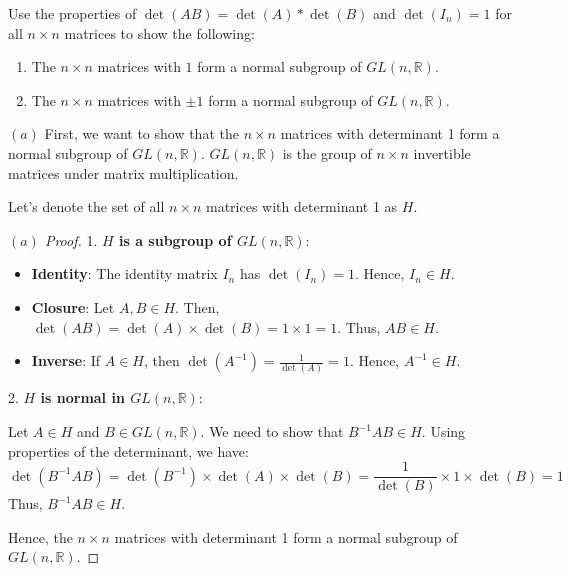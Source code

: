\documentclass[12pt]{amsart}
\theoremstyle{definition}
\numberwithin{equation}{section}
\theoremstyle{plain}
\newcommand{\R}{\mathbb{R}}
\begin{document}
\vspace*{20pt}
\begin{exercise}{40} Use the properties of $\det(AB) = \det(A)*\det(B)$ and $\det(I_n)=1$ for all $n\times n$ matrices to show the following:

    \begin{enumerate}[label=(\alph*.)]
        \item The $n \times n$ matrices with $1$ form a normal subgroup of $GL(n,\R)$.
        \item The $n \times n$ matrices with $\pm 1$ form a normal subgroup of $GL(n,\R)$.
    \end{enumerate}
    \textbf{\((a)\)} First, we want to show that the \( n \times n \) matrices with determinant 1 form a normal subgroup of \( GL(n,\R) \). \( GL(n,\R) \) is the group of \( n \times n \) invertible matrices under matrix multiplication.
    
    Let's denote the set of all \( n \times n \) matrices with determinant 1 as \( H \).
    
    \begin{proof}[\((a)\) Proof]
    
    1. \textbf{\( H \) is a subgroup of \( GL(n,\R) \)}:
    
       \begin{itemize}
        \item \textbf{Identity}: The identity matrix \( I_n \) has \( \det(I_n) = 1 \). Hence, \( I_n \in H \).
        \item \textbf{Closure}: Let \( A, B \in H \). Then, \( \det(AB) = \det(A) \times \det(B) = 1 \times 1 = 1 \). Thus, \( AB \in H \).
        \item \textbf{Inverse}: If \( A \in H \), then \( \det(A^{-1}) = \frac{1}{\det(A)} = 1 \). Hence, \( A^{-1} \in H \).
       \end{itemize}
    
    2. \textbf{\( H \) is normal in \( GL(n,\R) \)}:
    
       Let \( A \in H \) and \( B \in GL(n,\R) \). We need to show that \( B^{-1}AB \in H \). Using properties of the determinant, we have:
       \[
       \det(B^{-1}AB) = \det(B^{-1}) \times \det(A) \times \det(B) = \frac{1}{\det(B)} \times 1 \times \det(B) = 1
       \]
       Thus, \( B^{-1}AB \in H \).
    
    Hence, the \( n \times n \) matrices with determinant 1 form a normal subgroup of \( GL(n,\R) \).
    
    \end{proof}
    

\end{exercise}
\end{document}
